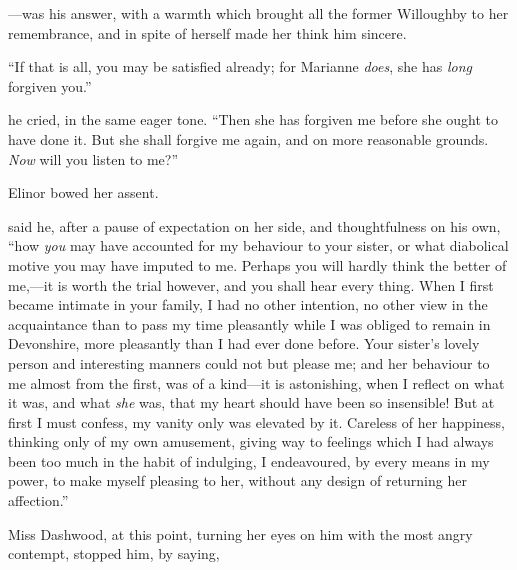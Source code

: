 
---was his answer, with a warmth which brought all the former Willoughby to her remembrance, and in spite of herself made her think him sincere.

“If that is all, you may be satisfied already; for Marianne {\em does}, she has {\em long} forgiven you.”

 he cried, in the same eager tone. “Then she has forgiven me before she ought to have done it. But she shall forgive me again, and on more reasonable grounds. {\em Now} will you listen to me?”

Elinor bowed her assent.

 said he, after a pause of expectation on her side, and thoughtfulness on his own, “how {\em you} may have accounted for my behaviour to your sister, or what diabolical motive you may have imputed to me. Perhaps you will hardly think the better of me,---it is worth the trial however, and you shall hear every thing. When I first became intimate in your family, I had no other intention, no other view in the acquaintance than to pass my time pleasantly while I was obliged to remain in Devonshire, more pleasantly than I had ever done before. Your sister's lovely person and interesting manners could not but please me; and her behaviour to me almost from the first, was of a kind---it is astonishing, when I reflect on what it was, and what {\em she} was, that my heart should have been so insensible! But at first I must confess, my vanity only was elevated by it. Careless of her happiness, thinking only of my own amusement, giving way to feelings which I had always been too much in the habit of indulging, I endeavoured, by every means in my power, to make myself pleasing to her, without any design of returning her affection.”

Miss Dashwood, at this point, turning her eyes on him with the most angry contempt, stopped him, by saying,


